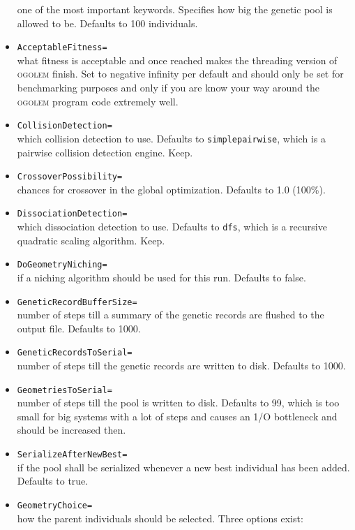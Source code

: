\documentclass[a4paper,10pt]{scrbook}
\newcommand{\ogo}{\textsc{ogolem}}
\begin{document}
\begin{itemize}
	one of the most important keywords. Specifies how big the genetic pool
is allowed to be. Defaults to 100 individuals.
  \item \texttt{AcceptableFitness=}\\
        \label{page1:acceptableFitness}
	what fitness is acceptable and once reached makes the threading version
	of \ogo{}
finish. Set to negative infinity per default and should only be set for
benchmarking purposes and only if you are know your way around the \ogo{}
program code extremely well.
  \item \texttt{CollisionDetection=}\\
	which collision detection to use. Defaults to \texttt{simplepairwise}, 
which is a pairwise
collision detection engine. Keep.
  \item \texttt{CrossoverPossibility=}\\
	chances for crossover in the global optimization. Defaults to 1.0
(100\%).
  \item \texttt{DissociationDetection=}\\
	which dissociation detection to use. Defaults to \texttt{dfs}, which is 
a
recursive quadratic scaling algorithm. Keep.
  \item \texttt{DoGeometryNiching=}\\
	if a niching algorithm should be used for this run. Defaults to false.
  \item \texttt{GeneticRecordBufferSize=}\\
        number of steps till a summary of the genetic records are flushed to
the output file. Defaults to 1000.
  \item \texttt{GeneticRecordsToSerial=}\\
	number of steps till the genetic records are written to disk. Defaults
to 1000.
  \item \texttt{GeometriesToSerial=}\\
	number of steps till the pool is written to disk. Defaults to
99, which is too small for big systems with a lot of steps and causes an 1/O
bottleneck and should be increased then.
  \item \texttt{SerializeAfterNewBest=}\\
	if the pool shall be serialized whenever a new best individual has been
added. Defaults to true.
  \item \texttt{GeometryChoice=}\\
	how the parent individuals should be selected. Three options exist:
	\begin{itemize}

\end{itemize}
\end{itemize}
\end{document}
